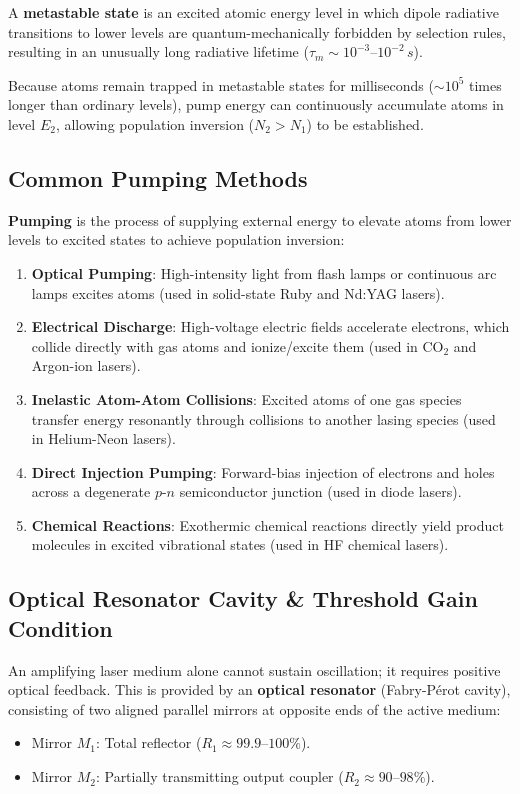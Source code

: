 \begin{definition}
A \textbf{metastable state} is an excited atomic energy level in which dipole radiative transitions to lower levels are quantum-mechanically forbidden by selection rules, resulting in an unusually long radiative lifetime ($\tau_m \sim 10^{-3}\text{--}10^{-2}\,\si{s}$).
\end{definition}
Because atoms remain trapped in metastable states for milliseconds ($\sim 10^5$ times longer than ordinary levels), pump energy can continuously accumulate atoms in level $E_2$, allowing population inversion ($N_2 > N_1$) to be established.

\subsection{Common Pumping Methods}
\textbf{Pumping} is the process of supplying external energy to elevate atoms from lower levels to excited states to achieve population inversion:
\begin{enumerate}
    \item \textbf{Optical Pumping}: High-intensity light from flash lamps or continuous arc lamps excites atoms (used in solid-state Ruby and Nd:YAG lasers).
    \item \textbf{Electrical Discharge}: High-voltage electric fields accelerate electrons, which collide directly with gas atoms and ionize/excite them (used in $\text{CO}_2$ and Argon-ion lasers).
    \item \textbf{Inelastic Atom-Atom Collisions}: Excited atoms of one gas species transfer energy resonantly through collisions to another lasing species (used in Helium-Neon lasers).
    \item \textbf{Direct Injection Pumping}: Forward-bias injection of electrons and holes across a degenerate $p$-$n$ semiconductor junction (used in diode lasers).
    \item \textbf{Chemical Reactions}: Exothermic chemical reactions directly yield product molecules in excited vibrational states (used in HF chemical lasers).
\end{enumerate}

\subsection{Optical Resonator Cavity \& Threshold Gain Condition}
An amplifying laser medium alone cannot sustain oscillation; it requires positive optical feedback. This is provided by an \textbf{optical resonator} (Fabry-Pérot cavity), consisting of two aligned parallel mirrors at opposite ends of the active medium:
\begin{itemize}
    \item Mirror $M_1$: Total reflector ($R_1 \approx 99.9\text{--}100\%$).
    \item Mirror $M_2$: Partially transmitting output coupler ($R_2 \approx 90\text{--}98\%$).
\end{itemize}

